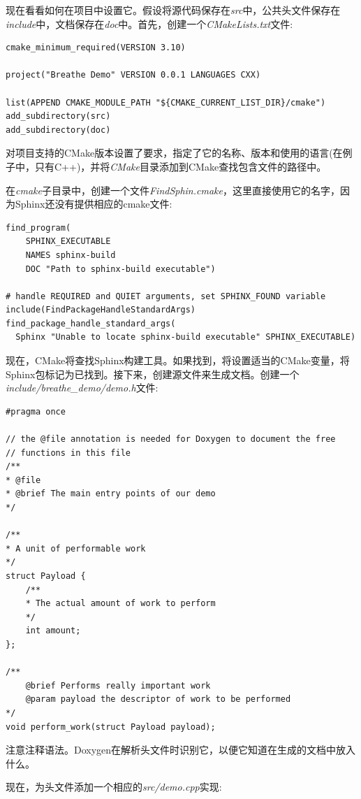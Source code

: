 现在看看如何在项目中设置它。假设将源代码保存在\textit{src}中，公共头文件保存在\textit{include}中，文档保存在\textit{doc}中。首先，创建一个\textit{CMakeLists.txt}文件:

\begin{lstlisting}[style=styleCMake]
cmake_minimum_required(VERSION 3.10)

project("Breathe Demo" VERSION 0.0.1 LANGUAGES CXX)

list(APPEND CMAKE_MODULE_PATH "${CMAKE_CURRENT_LIST_DIR}/cmake")
add_subdirectory(src)
add_subdirectory(doc)
\end{lstlisting}

对项目支持的CMake版本设置了要求，指定了它的名称、版本和使用的语言(在例子中，只有C++)，并将\textit{CMake}目录添加到CMake查找包含文件的路径中。

在\textit{cmake}子目录中，创建一个文件\textit{FindSphin.cmake}，这里直接使用它的名字，因为Sphinx还没有提供相应的cmake文件:

\begin{lstlisting}[style=styleCMake]
find_program(
	SPHINX_EXECUTABLE
	NAMES sphinx-build
	DOC "Path to sphinx-build executable")

# handle REQUIRED and QUIET arguments, set SPHINX_FOUND variable
include(FindPackageHandleStandardArgs)
find_package_handle_standard_args(
  Sphinx "Unable to locate sphinx-build executable" SPHINX_EXECUTABLE)
\end{lstlisting}

现在，CMake将查找Sphinx构建工具。如果找到，将设置适当的CMake变量，将Sphinx包标记为已找到。接下来，创建源文件来生成文档。创建一个\textit{include/breathe\_demo/demo.h}文件:

\begin{lstlisting}[style=styleCXX]
#pragma once

// the @file annotation is needed for Doxygen to document the free
// functions in this file
/**
* @file
* @brief The main entry points of our demo
*/

/**
* A unit of performable work
*/
struct Payload {
	/**
	* The actual amount of work to perform
	*/
	int amount;
};

/**
	@brief Performs really important work
	@param payload the descriptor of work to be performed
*/
void perform_work(struct Payload payload);
\end{lstlisting}

注意注释语法。Doxygen在解析头文件时识别它，以便它知道在生成的文档中放入什么。

现在，为头文件添加一个相应的\textit{src/demo.cpp}实现:

